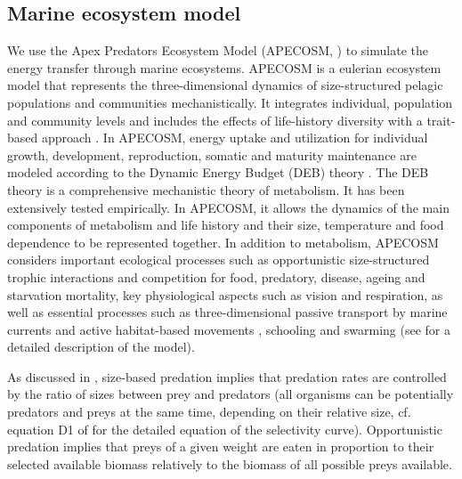 
\subsection{Marine ecosystem model}
\label{sec:apecosm}

We use the Apex Predators Ecosystem Model (APECOSM, \citealp{mauryModelingEnvironmentalEffects2007, mauryOverviewAPECOSMSpatialized2010}) to simulate the energy transfer through marine ecosystems. 
APECOSM is a eulerian ecosystem model that represents the three-dimensional dynamics of size-structured pelagic populations and communities mechanistically. It integrates individual, population and community levels and includes the effects of life-history diversity with a trait-based approach \citep{mauryIndividualsPopulationsCommunities2013}. In APECOSM, energy uptake and utilization for individual growth, development, reproduction, somatic and maturity maintenance are modeled according to the Dynamic Energy Budget (DEB) theory \citep{koojmanDynamicEnergyBudget2010}. The DEB theory is a comprehensive mechanistic theory of metabolism. It has been extensively tested empirically. In APECOSM, it allows the dynamics of the main components of metabolism and life history and their size, temperature and food dependence to be represented together. In addition to metabolism, APECOSM considers important ecological processes such as opportunistic size-structured trophic interactions and competition for food, predatory, disease, ageing and starvation mortality, key physiological aspects such as vision and respiration, as well as essential processes such as three-dimensional passive transport by marine currents and active habitat-based movements \citep{faugerasAdvectiondiffusionreactionSizestructuredFish2005}, schooling and swarming (see \citealp{mauryModelingEnvironmentalEffects2007, mauryIndividualsPopulationsCommunities2013, mauryCanSchoolingRegulate2017} for a detailed description of the model). 

As discussed in \cite{mauryIndividualsPopulationsCommunities2013}, size-based predation implies that predation rates are controlled by the ratio of sizes
between prey and predators (all organisms can be potentially predators and
preys at the same time, depending on their relative size, cf. equation D1 of \cite{mauryIndividualsPopulationsCommunities2013} for the detailed equation of the selectivity curve). Opportunistic predation implies that preys
of a given weight are eaten in proportion to their selected
available biomass relatively to the biomass of all possible preys
available.

